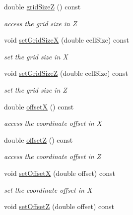 \begin{DoxyCompactItemize}
double \hyperlink{class_d_d4hep_1_1_geometry_1_1_cartesian_grid_x_z_a658ed30a1835aa1e6fa20ce8d209e491}{gridSizeZ} () const 
\begin{DoxyCompactList}\small\item\em access the grid size in Z \item\end{DoxyCompactList}\item 
void \hyperlink{class_d_d4hep_1_1_geometry_1_1_cartesian_grid_x_z_a58b8f64a7b2e3e7bb917f4a38a441464}{setGridSizeX} (double cellSize) const 
\begin{DoxyCompactList}\small\item\em set the grid size in X \item\end{DoxyCompactList}\item 
void \hyperlink{class_d_d4hep_1_1_geometry_1_1_cartesian_grid_x_z_a343c4fbce4c2a9d05db04720f102f5a5}{setGridSizeZ} (double cellSize) const 
\begin{DoxyCompactList}\small\item\em set the grid size in Z \item\end{DoxyCompactList}\item 
double \hyperlink{class_d_d4hep_1_1_geometry_1_1_cartesian_grid_x_z_a37ed2e0a3619c4d8f6f87c6a1cf3bd37}{offsetX} () const 
\begin{DoxyCompactList}\small\item\em access the coordinate offset in X \item\end{DoxyCompactList}\item 
double \hyperlink{class_d_d4hep_1_1_geometry_1_1_cartesian_grid_x_z_abcfda669a424829bd828df6a2448d7a2}{offsetZ} () const 
\begin{DoxyCompactList}\small\item\em access the coordinate offset in Z \item\end{DoxyCompactList}\item 
void \hyperlink{class_d_d4hep_1_1_geometry_1_1_cartesian_grid_x_z_a69229e9f2c58e33b5582f7e49af39bf9}{setOffsetX} (double offset) const 
\begin{DoxyCompactList}\small\item\em set the coordinate offset in X \item\end{DoxyCompactList}\item 
void \hyperlink{class_d_d4hep_1_1_geometry_1_1_cartesian_grid_x_z_a2cd92081fe24132f9f21865e6cebc887}{setOffsetZ} (double offset) const 

\end{DoxyCompactItemize}
